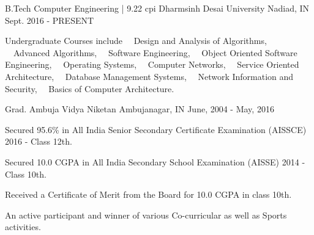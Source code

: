 


\begin{cventries}

\cventry
{B.Tech Computer Engineering | 9.22 cpi} %
{Dharmsinh Desai University} %
{Nadiad, IN} %
{Sept. 2016 - PRESENT} %
{ %
\begin{cvitems}
\item {Undergraduate Courses include ~~Design and Analysis of Algorithms, ~~Advanced Algorithms, ~~Software Engineering, ~~Object Oriented Software Engineering, ~~Operating Systems, ~~Computer Networks, ~~Service Oriented Architecture,  ~~Database Management Systems, ~~Network Information and Security, ~~Basics of Computer Architecture.}
\end{cvitems}
}




\cventry
{Grad.} %
{Ambuja Vidya Niketan} %
{Ambujanagar, IN} %
{June, 2004 - May, 2016} %
{ %
\begin{cvitems}
\item {Secured 95.6\% in All India Senior Secondary Certificate Examination (AISSCE) 2016 - Class 12th.}
\item {Secured 10.0 CGPA in All India Secondary School Examination (AISSE) 2014 - Class 10th.}
\item {Received a Certificate of Merit from the Board for 10.0 CGPA in class 10th.}
\item {An active participant and winner of various Co-curricular as well as Sports activities.}
\end{cvitems}
}

\end{cventries}

